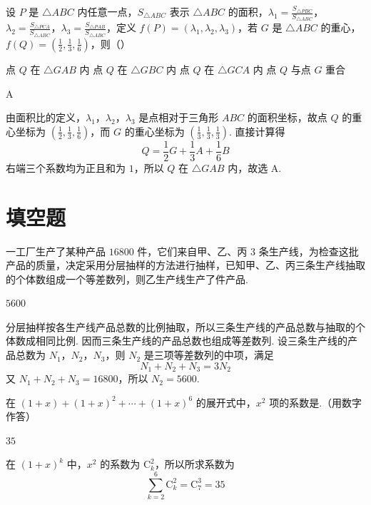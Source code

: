 \begin{problem}
设 \(P\) 是 \(\triangle ABC\) 内任意一点，\(S_{\triangle ABC}\) 表示 \(\triangle ABC\) 的面积，\(\lambda_1 = \frac{S_{\triangle PBC}}{S_{\triangle ABC}}\)，\(\lambda_2 = \frac{S_{\triangle PCA}}{S_{\triangle ABC}}\)，\(\lambda_3 = \frac{S_{\triangle PAB}}{S_{\triangle ABC}}\)，定义 \(f(P) = (\lambda_1, \lambda_2, \lambda_3)\)，若 \(G\) 是 \(\triangle ABC\) 的重心，\(f(Q) = \left(\frac{1}{2}, \frac{1}{3}, \frac{1}{6}\right)\)，则（\quad）

\choices
    {点 \(Q\) 在 \(\triangle GAB\) 内}
    {点 \(Q\) 在 \(\triangle GBC\) 内}
    {点 \(Q\) 在 \(\triangle GCA\) 内}
    {点 \(Q\) 与点 \(G\) 重合}

\begin{answer}
A
\end{answer}

\begin{solution}
由面积比的定义，\(\lambda_1\)，\(\lambda_2\)，\(\lambda_3\) 是点相对于三角形 \(ABC\) 的面积坐标，故点 \(Q\) 的重心坐标为 \(\left(\frac12,\frac13,\frac16\right)\)，而 \(G\) 的重心坐标为 \(\left(\frac13,\frac13,\frac13\right)\). 直接计算得
\[
Q=\frac12G+\frac13A+\frac16B
\]
右端三个系数均为正且和为 \(1\)，所以 \(Q\) 在 \(\triangle GAB\) 内，故选 A.
\end{solution}
\end{problem}

\section{填空题}
\begin{problem}
一工厂生产了某种产品 \(16800\) 件，它们来自甲、乙、丙 \(3\) 条生产线，为检查这批产品的质量，决定采用分层抽样的方法进行抽样，已知甲、乙、丙三条生产线抽取的个体数组成一个等差数列，则乙生产线生产了\fillinblank{}件产品.

\begin{answer}
\(5600\)
\end{answer}

\begin{solution}
分层抽样按各生产线产品总数的比例抽取，所以三条生产线的产品总数与抽取的个体数成相同比例. 因而三条生产线的产品总数也组成等差数列. 设三条生产线的产品总数为 \(N_1\)，\(N_2\)，\(N_3\)，则 \(N_2\) 是三项等差数列的中项，满足
\[
N_1+N_2+N_3=3N_2
\]
又 \(N_1+N_2+N_3=16800\)，所以 \(N_2=5600\).
\end{solution}
\end{problem}

\begin{problem}
在 \((1 + x) + (1 + x)^2 + \cdots + (1 + x)^6\) 的展开式中，\(x^2\) 项的系数是\fillinblank{}.（用数字作答）

\begin{answer}
\(35\)
\end{answer}

\begin{solution}
在 \((1+x)^k\) 中，\(x^2\) 的系数为 \(\mathrm C_k^2\)，所以所求系数为
\[
\sum_{k=2}^{6}\mathrm C_k^2=\mathrm C_7^3=35
\]
\end{solution}
\end{problem}

